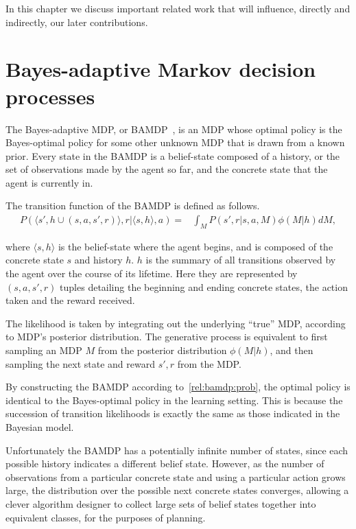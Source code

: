 
In this chapter we discuss important related work that will influence, directly and indirectly, our later contributions.



\section{Bayes-adaptive Markov decision processes}

The Bayes-adaptive MDP, or BAMDP~\cite{duff03}, is an MDP whose optimal policy is the Bayes-optimal policy for some other unknown MDP that is drawn from a known prior. Every state in the BAMDP is a belief-state composed of a history, or the set of observations made by the agent so far, and the concrete state that the agent is currently in.

The transition function of the BAMDP is defined as follows.
\begin{eqnarray}
\label{rel:bamdp:prob}
P(\langle s', h\cup (s,a,s',r)\rangle, r | \langle s, h\rangle, a) =& \int_M P(s', r | s, a, M)\phi(M|h) dM,
\end{eqnarray}

where $\langle s, h\rangle$ is the belief-state where the agent begins, and is composed of the concrete state $s$ and history $h$. $h$ is the summary of all transitions observed by the agent over the course of its lifetime. Here they are represented by $(s, a, s',r)$ tuples detailing the beginning and ending concrete states, the action taken and the reward received.

The likelihood is taken by integrating out the underlying ``true'' MDP, according to MDP's posterior distribution. The generative process is equivalent to first sampling an MDP $M$ from the posterior distribution $\phi(M|h)$, and then sampling the next state and reward $s', r$ from the MDP.

By constructing the BAMDP according to~\ref{rel:bamdp:prob}, the optimal policy is identical to the Bayes-optimal policy in the learning setting. This is because the succession of transition likelihoods is exactly the same as those indicated in the Bayesian model.

Unfortunately the BAMDP has a potentially infinite number of states, since each possible history indicates a different belief state. However, as the number of observations from a particular concrete state and using a particular action grows large, the distribution over the possible next concrete states converges, allowing a clever algorithm designer to collect large sets of belief states together into equivalent classes, for the purposes of planning.



